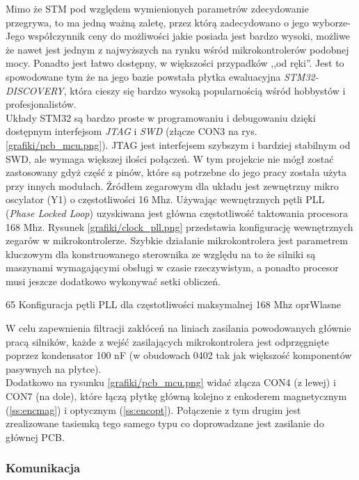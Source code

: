 Mimo że STM pod względem wymienionych parametrów zdecydowanie przegrywa, to ma jedną ważną zaletę, przez którą zadecydowano o jego wyborze- Jego współczynnik ceny do możliwości jakie posiada jest bardzo wysoki, możliwe że nawet jest jednym z najwyższych na rynku wśród mikrokontrolerów podobnej mocy. Ponadto jest łatwo dostępny, w większości przypadków ,,od ręki''. Jest to spowodowane tym że na jego bazie powstała płytka ewaluacyjna {\it STM32-DISCOVERY}, która cieszy się bardzo wysoką popularnością wśród hobbystów i profesjonalistów. \\

Układy STM32 są bardzo proste w programowaniu i debugowaniu dzięki dostępnym interfejsom {\it JTAG} i {\it SWD} (złącze CON3 na rys. \ref{grafiki/pcb_mcu.png}). JTAG jest interfejsem szybszym i bardziej stabilnym od SWD, ale wymaga większej ilości połączeń. W tym projekcie nie mógł zostać zastosowany gdyż część z pinów, które są potrzebne do jego pracy została użyta przy innych modułach. Źródłem zegarowym dla układu jest zewnętrzny mikro oscylator (Y1) o częstotliwości 16 Mhz. Używając wewnętrznych pętli PLL ({\it Phase Locked Loop}) uzyskiwana jest główna częstotliwość taktowania procesora 168 Mhz. Rysunek \ref{grafiki/clock_pll.png} przedstawia konfigurację wewnętrznych zegarów w mikrokontrolerze. Szybkie działanie mikrokontrolera jest parametrem kluczowym dla konstruowanego sterownika ze względu na to że silniki są maszynami wymagającymi obsługi w czasie rzeczywistym, a ponadto procesor musi jeszcze dodatkowo wykonywać setki obliczeń.

	{65}
	{Konfiguracja pętli PLL dla częstotliwości maksymalnej 168 Mhz}
	{oprWlasne}

W celu zapewnienia filtracji zakłóceń na liniach zasilania powodowanych głównie pracą silników, każde z wejść zasilających mikrokontrolera jest odprzęgnięte poprzez kondensator 100 nF (w obudowach 0402 tak jak większość komponentów pasywnych na płytce). \\

Dodatkowo na rysunku \ref{grafiki/pcb_mcu.png} widać złącza CON4 (z lewej) i CON7 (na dole), które łączą płytkę główną kolejno z enkoderem magnetycznym (\ref{ss:encmag}) i optycznym (\ref{ss:encopt}). Połączenie z tym drugim jest zrealizowane tasiemką tego samego typu co doprowadzane jest zasilanie do głównej PCB.

\subsubsection{Komunikacja}
\label{sss:hardware_komunikacja}

